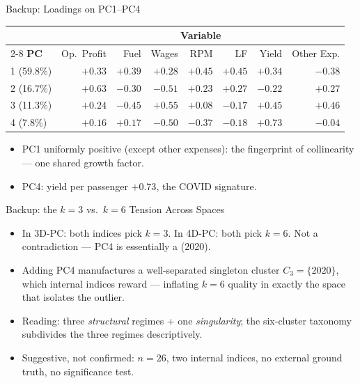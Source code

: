 \documentclass[10pt,aspectratio=169]{beamer}
\newcommand{\pc}[1]{PC#1}
\begin{document}
\begin{frame}{Backup: Loadings on \pc{1}--\pc{4}}
  \begin{center}
  \setlength{\tabcolsep}{7pt}
  \begin{tabular}{@{}l *{7}{r}@{}}
  \toprule
   & \multicolumn{7}{c}{\textbf{Variable}} \\
  \cmidrule(l){2-8}
  \textbf{\pc{}} & Op.~Profit & Fuel & Wages & RPM & LF & Yield & Other Exp. \\
  \midrule
  1 (59.8\%) & $+0.33$ & $+0.39$ & $+0.28$ & $\mathbf{+0.45}$ &
    $\mathbf{+0.45}$ & $+0.34$ & $-0.38$ \\
  2 (16.7\%) & $\mathbf{+0.63}$ & $-0.30$ & $\mathbf{-0.51}$ & $+0.23$ &
    $+0.27$ & $-0.22$ & $+0.27$ \\
  3 (11.3\%) & $+0.24$ & $\mathbf{-0.45}$ & $+0.55$ & $+0.08$ &
    $-0.17$ & $\mathbf{+0.45}$ & $+0.46$ \\
  4 (7.8\%)  & $+0.16$ & $+0.17$ & $-0.50$ & $-0.37$ & $-0.18$ &
    $\mathbf{+0.73}$ & $-0.04$ \\
  \bottomrule
  \end{tabular}
  \end{center}
  \vspace{0.3cm}
  \begin{itemize}
    \item \pc{1} uniformly positive (except other expenses): the fingerprint
      of collinearity --- one shared growth factor.
    \item \pc{4}: yield per passenger $+0.73$, the COVID signature.
  \end{itemize}
\end{frame}



\begin{frame}{Backup: the $k=3$ vs.\ $k=6$ Tension Across Spaces}
  \begin{itemize}
    \setlength{\itemsep}{0.35cm}
    \item In 3D-\pc{}: both indices pick $k=3$. In 4D-\pc{}: both pick $k=6$.
      Not a contradiction --- \pc{4} is essentially a
       (2020).
    \item Adding \pc{4} manufactures a well-separated singleton cluster
      $C_3 = \{2020\}$, which internal indices reward --- inflating $k=6$
      quality in exactly the space that isolates the outlier.
    \item Reading: three \emph{structural} regimes + one \emph{singularity};
      the six-cluster taxonomy subdivides the three regimes descriptively.
    \item Suggestive, not confirmed: $n=26$, two internal indices, no external
      ground truth, no significance test.
  \end{itemize}
\end{frame}
\end{document}
